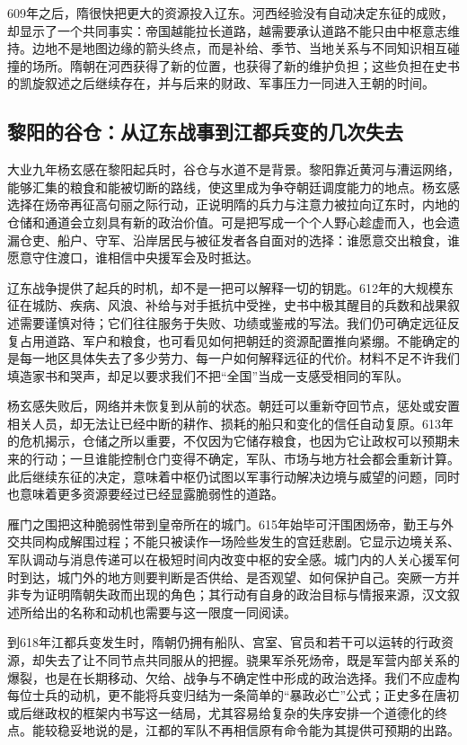 609年之后，隋很快把更大的资源投入辽东。河西经验没有自动决定东征的成败，却显示了一个共同事实：帝国越能拉长道路，越需要承认道路不能只由中枢意志维持。边地不是地图边缘的箭头终点，而是补给、季节、当地关系与不同知识相互碰撞的场所。隋朝在河西获得了新的位置，也获得了新的维护负担；这些负担在史书的凯旋叙述之后继续存在，并与后来的财政、军事压力一同进入王朝的时间。

\subsection{黎阳的谷仓：从辽东战事到江都兵变的几次失去}
大业九年杨玄感在黎阳起兵时，谷仓与水道不是背景。黎阳靠近黄河与漕运网络，能够汇集的粮食和能被切断的路线，使这里成为争夺朝廷调度能力的地点。杨玄感选择在炀帝再征高句丽之际行动，正说明隋的兵力与注意力被拉向辽东时，内地的仓储和通道会立刻具有新的政治价值。可是把写成一个个人野心趁虚而入，也会遗漏仓吏、船户、守军、沿岸居民与被征发者各自面对的选择：谁愿意交出粮食，谁愿意守住渡口，谁相信中央援军会及时抵达。

辽东战争提供了起兵的时机，却不是一把可以解释一切的钥匙。612年的大规模东征在城防、疾病、风浪、补给与对手抵抗中受挫，史书中极其醒目的兵数和战果叙述需要谨慎对待；它们往往服务于失败、功绩或鉴戒的写法。我们仍可确定远征反复占用道路、军户和粮食，也可看见如何把朝廷的资源配置推向紧绷。不能确定的是每一地区具体失去了多少劳力、每一户如何解释远征的代价。材料不足不许我们填造家书和哭声，却足以要求我们不把“全国”当成一支感受相同的军队。

杨玄感失败后，网络并未恢复到从前的状态。朝廷可以重新夺回节点，惩处或安置相关人员，却无法让已经中断的耕作、损耗的船只和变化的信任自动复原。613年的危机揭示，仓储之所以重要，不仅因为它储存粮食，也因为它让政权可以预期未来的行动；一旦谁能控制仓门变得不确定，军队、市场与地方社会都会重新计算。此后继续东征的决定，意味着中枢仍试图以军事行动解决边境与威望的问题，同时也意味着更多资源要经过已经显露脆弱性的道路。

雁门之围把这种脆弱性带到皇帝所在的城门。615年始毕可汗围困炀帝，勤王与外交共同构成解围过程；不能只被读作一场险些发生的宫廷悲剧。它显示边境关系、军队调动与消息传递可以在极短时间内改变中枢的安全感。城门内的人关心援军何时到达，城门外的地方则要判断是否供给、是否观望、如何保护自己。突厥一方并非专为证明隋朝失政而出现的角色；其行动有自身的政治目标与情报来源，汉文叙述所给出的名称和动机也需要与这一限度一同阅读。

到618年江都兵变发生时，隋朝仍拥有船队、宫室、官员和若干可以运转的行政资源，却失去了让不同节点共同服从的把握。骁果军杀死炀帝，既是军营内部关系的爆裂，也是在长期移动、欠给、战争与不确定性中形成的政治选择。我们不应虚构每位士兵的动机，更不能将兵变归结为一条简单的“暴政必亡”公式；正史多在唐初或后继政权的框架内书写这一结局，尤其容易给复杂的失序安排一个道德化的终点。能较稳妥地说的是，江都的军队不再相信原有命令能为其提供可预期的出路。

